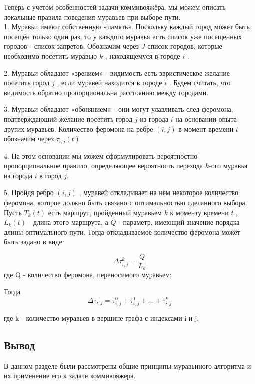 \documentclass[a4paper, 12pt]{article}
\begin{document}
	Теперь с учетом особенностей задачи коммивояжёра, мы можем описать локальные правила поведения муравьев при выборе пути.\\
	
	1. Муравьи имеют собственную «память». Поскольку каждый город может быть посещён только один раз, то у каждого муравья есть список уже посещенных городов - список запретов. Обозначим через $J$ список городов, которые необходимо посетить муравью $k$ , находящемуся в городе $i$ . 
	
	2. Муравьи обладают «зрением» - видимость есть эвристическое желание посетить город $j$ , если муравей находится в городе $i$ . Будем считать, что видимость обратно пропорциональна расстоянию между городами. 
	
	3. Муравьи обладают «обонянием» - они могут улавливать след феромона, подтверждающий желание посетить город $j$ из города $i$ на основании опыта других муравьёв. Количество феромона на ребре $(i,j)$ в момент времени $t$ обозначим через  $\tau _{i,j} (t)$ 
	
	4. На этом основании мы можем сформулировать вероятностно-пропорциональное правило, определяющее вероятность перехода $k$-ого муравья из города $i$  в город $j$. 
	
	5. Пройдя ребро $(i,j)$ , муравей откладывает на нём некоторое количество феромона, которое должно быть связано с оптимальностью сделанного выбора. Пусть $T _{k} (t)$ есть маршрут, пройденный муравьем $k$ к моменту времени $t$ , $L _{k} (t)$ - длина этого маршрута, а $Q$ - параметр, имеющий значение порядка длины оптимального пути. Тогда откладываемое количество феромона может быть задано в виде:
	
	\begin{equation}\label{form:add} 
		\Delta \tau_{i,j}^k=\frac{Q}{L_{k}}
	\end{equation}
	где \quad Q - количество феромона, переносимого муравьем;
	
	Тогда
	\begin{equation}\label{form:add1} 
		\Delta \tau _{i,j}= \tau _{i,j}^0 + \tau _{i,j}^1 + ... + \tau _{i,j}^k 
	\end{equation}
	
	где k - количество муравьев в вершине графа с индексами i и j.
	\subsection{Вывод}
	\hspace*{5mm} В данном разделе были рассмотрены общие принципы муравьиного алгоритма и их применение его к задаче коммивояжера. 
\end{document}

